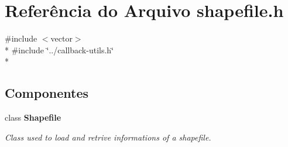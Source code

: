 \section{Referência do Arquivo shapefile.\+h}
\label{shapefile_8h}
{\ttfamily \#include $<$vector$>$}\\*
{\ttfamily \#include \char`\"{}../callback-\/utils.\+h\char`\"{}}\\*
\subsection*{Componentes}
\begin{DoxyCompactItemize}
\item 
class {\bf Shapefile}
\begin{DoxyCompactList}\small\item\em Class used to load and retrive informations of a shapefile. \end{DoxyCompactList}\end{DoxyCompactItemize}
